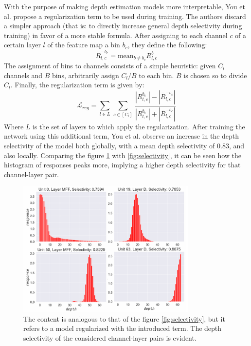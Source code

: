 With the purpose of making depth estimation models more interpretable, You et al. propose a regularization term to be used during training.
The authors discard a simpler approach (that is: to directly increase general depth selectivity during training) in favor of a more stable formula.
After assigning to each channel $c$ of a certain layer $l$ of the feature map a bin $b_{c}$, they define the following:
\[
    \bar{R}_{l, c}^{-b_{c}} = \text{mean}_{b \neq b_{c}} R_{l, c}^{b}
\]
The assignment of bins to channels consists of a simple heuristic: given $C_{l}$ channels and $B$ bins, arbitrarily assign $C_{l} / B$ to each bin.
$B$ is chosen so to divide $C_{l}$.
Finally, the regularization term is given by:
\[
    \mathcal{L}_{reg} =
    \sum_{l \in L} \,
    \sum_{c \in [C_{l}]} \,
        \frac
            {|R_{l, c}^{b_{c}}| - |\bar{R}_{l, c}^{-b_{c}}|}
            {|R_{l, c}^{b_{c}}| + |\bar{R}_{l, c}^{-b_{c}}|}
\]
Where $L$ is the set of layers to which apply the regularization.
After training the network using this additional term, You et al. observe an increase in the depth selectivity of the model both globally, with a mean depth selectivity of 0.83, and also locally.
Comparing the figure \ref{fig:increased_selectivity}  with \ref{fig:selectivity}, it can be seen how the histogram of responses peaks more, implying a higher depth selectivity for that channel-layer pair.

\begin{figure}
    \centering
    \includegraphics[width=0.8\textwidth]{figs/increased_selectivity}
    \caption{
        The content is analogous to that of the figure \ref{fig:selectivity}, but it refers to a model regularized with the introduced term.
        The depth selectivity of the considered channel-layer pairs is evident.
        \label{fig:increased_selectivity}
    }
\end{figure}